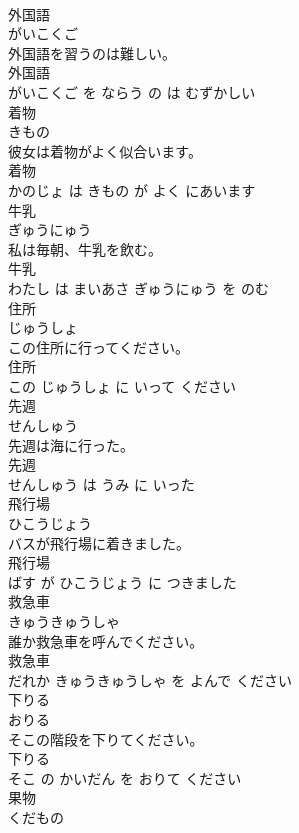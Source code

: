\documentclass[8pt]{extreport}
\begin{document}
\begin{CJK}{UTF8}{min}
\\	外国語	
\\	がいこくご			
\\	外国語を習うのは難しい。	
\\	外国語 
\\	がいこくご を ならう の は むずかしい			
\\	着物	
\\	きもの			
\\	彼女は着物がよく似合います。	
\\	着物 
\\	かのじょ は きもの が よく にあいます			
\\	牛乳	
\\	ぎゅうにゅう			
\\	私は毎朝、牛乳を飲む。	
\\	牛乳 
\\	わたし は まいあさ ぎゅうにゅう を のむ			
\\	住所	
\\	じゅうしょ			
\\	この住所に行ってください。	
\\	住所 
\\	この じゅうしょ に いって ください			
\\	先週	
\\	せんしゅう			
\\	先週は海に行った。	
\\	先週 
\\	せんしゅう は うみ に いった			
\\	飛行場	
\\	ひこうじょう			
\\	バスが飛行場に着きました。	
\\	飛行場 
\\	ばす が ひこうじょう に つきました			
\\	救急車	
\\	きゅうきゅうしゃ			
\\	誰か救急車を呼んでください。	
\\	救急車 
\\	だれか きゅうきゅうしゃ を よんで ください			
\\	下りる	
\\	おりる			
\\	そこの階段を下りてください。	
\\	下りる 
\\	そこ の かいだん を おりて ください			
\\	果物	
\\	くだもの			

\end{CJK}
\end{document}
